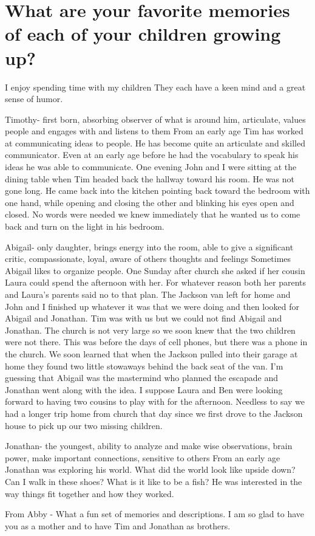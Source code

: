 \section{What are your favorite memories of each of your children growing up?}
I enjoy spending time with my children They each have a keen mind and a great sense of humor.

Timothy- first born, absorbing observer of what is around him, articulate, values people and engages with and listens to them
From an early age Tim has worked at communicating ideas to people.
He has become quite an articulate and skilled communicator.
Even at an early age before he had the vocabulary to speak his ideas he was able to communicate.
One evening John and I were sitting at the dining table when Tim headed back the hallway toward his room.
He was not gone long.
He came back into the kitchen pointing back toward the bedroom with one hand, while opening and closing the other and blinking his eyes open and closed.
No words were needed we knew immediately that he wanted us to come back and turn on the light in his bedroom.

Abigail- only daughter, brings energy into the room, able to give a significant critic, compassionate, loyal, aware of others thoughts and feelings
Sometimes Abigail likes to organize people.
One Sunday after church she asked if her cousin Laura could spend the afternoon with her.
For whatever reason both her parents and Laura's parents said no to that plan.
The Jackson van left for home and John and I finished up whatever it was that we were doing and then looked for Abigail and Jonathan.
Tim was with us but we could not find Abigail and Jonathan.
The church is not very large so we soon knew that the two children were not there.
This was before the days of cell phones, but there was a phone in the church.
We soon learned that when the Jackson pulled into their garage at home they found two little stowaways behind the back seat of the van.
I'm guessing that Abigail was the mastermind who planned the escapade and Jonathan went along with the idea.
I suppose Laura and Ben were looking forward to having two cousins to play with for the afternoon.
Needless to say we had a longer trip home from church that day since we first drove to the Jackson house to pick up our two missing children.

Jonathan- the youngest, ability to analyze and make wise observations, brain power, make important connections, sensitive to others
From an early age Jonathan was exploring his world.
What did the world look like upside down? Can I walk in these shoes? What is it like to be a fish? He was interested in the way things fit together and how they worked.

From Abby - What a fun set of memories and descriptions.
I am so glad to have you as a mother and to have Tim and Jonathan as brothers.





